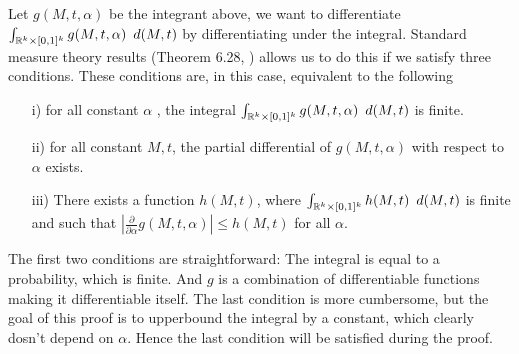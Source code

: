 Let $g(M,t,\alpha)$ be the integrant above, we want to differentiate $\int_{\mathbb{R}^k\times[0,1]^k} g(M,t,\alpha) \enspace d(M,t)$ by differentiating under the integral. Standard measure theory results (Theorem 6.28, \cite{Klenke:2013}) allows us to do this if we satisfy three conditions. These conditions are, in this case, equivalent to the following
\begin{enumerate}
    \item[i)] for all constant $\alpha$
    , the integral $\int_{\mathbb{R}^k\times[0,1]^k} g(M,t,\alpha) \enspace d(M,t)$ is finite.
    \item[ii)] for all constant $M,t$, the partial differential of $g(M,t,\alpha)$ with respect to $\alpha$ exists.
    \item[iii)] There exists a function $h(M,t)$, where $\int_{\mathbb{R}^k\times[0,1]^k} h(M,t) \enspace d(M,t)$ is finite and such that $|\frac{\partial}{\partial\alpha}g(M,t,\alpha)|\le h(M,t)$ for all $\alpha$.
\end{enumerate}
The first two conditions are straightforward: The integral is equal to a probability, which is finite. And $g$ is a combination of differentiable functions making it differentiable itself.
The last condition is more cumbersome, but the goal of this proof is to upperbound the integral by a constant, which clearly dosn't depend on $\alpha$. Hence the last condition will be satisfied during the proof. 

